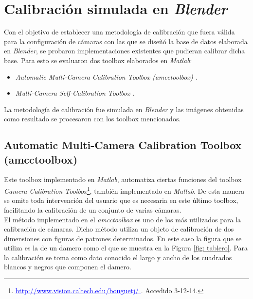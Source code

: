 \section{Calibración simulada en \emph{Blender}}
 
 Con el objetivo de establecer una metodología de calibración que fuera válida para la configuración de cámaras con las que se diseñó la base de datos elaborada en \emph{Blender}, se probaron implementaciones existentes que pudieran calibrar dicha base. Para esto se evaluaron dos toolbox elaborados en \emph{Matlab}: 
 \begin{itemize}
 \item  \emph{Automatic Multi-Camera Calibration Toolbox (amcctoolbox) \cite{amcctoolbox}.}
 \item  \emph{Multi-Camera Self-Calibration Toolbox \cite{toolbox_led}.}
 \end{itemize} 
 
La metodología de calibración fue simulada en \emph{Blender} y las imágenes obtenidas como resultado se procesaron con los toolbox mencionados.
 

 
\subsection{Automatic Multi-Camera Calibration Toolbox (amcctoolbox)   }


Este toolbox implementado en \emph{Matlab}, automatiza ciertas funciones del  toolbox \textit{Camera Calibration Toolbox}\footnote{\textcolor{blue}{\underline{http://www.vision.caltech.edu/bouguetj/   }}. Accedido 3-12-14.}, también implementado en \emph{Matlab}. De esta manera se omite toda intervención del usuario que es necesaria en este último toolbox, facilitando la calibración de un conjunto de varias cámaras.\\

El método implementado en el \textit{amcctoolbox} es uno de los más utilizados para la calibración de cámaras. Dicho método utiliza un objeto de calibración de dos dimensiones con figuras de patrones determinados. En este caso la figura que se utiliza es la de un damero como el que se muestra en la Figura \ref{fig: tablero}. Para la calibración se toma como dato conocido el largo y ancho de los cuadrados blancos y negros que componen el damero.

